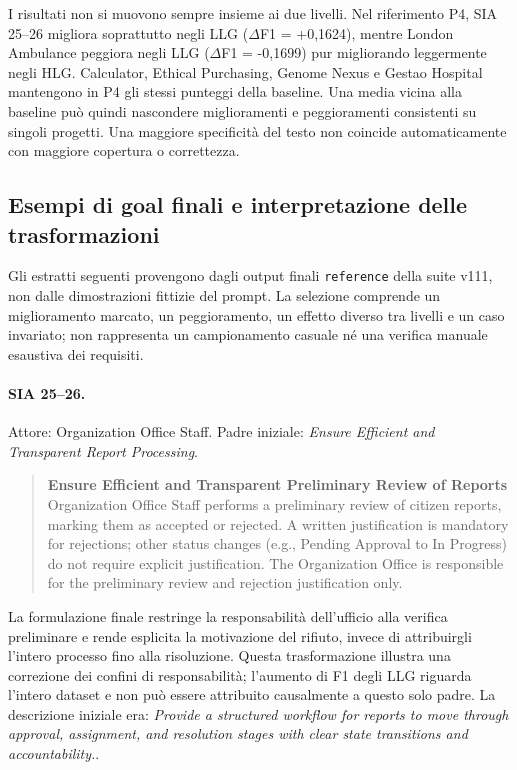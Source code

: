 I risultati non si muovono sempre insieme ai due livelli.
Nel riferimento P4, SIA 25--26 migliora soprattutto negli LLG
($\Delta$F1 = +0,1624), mentre London Ambulance peggiora negli LLG
($\Delta$F1 = -0,1699) pur migliorando leggermente negli HLG.
Calculator, Ethical Purchasing, Genome Nexus e Gestao Hospital
mantengono in P4 gli stessi punteggi della baseline. Una media vicina
alla baseline pu\`o quindi nascondere miglioramenti e peggioramenti
consistenti su singoli progetti. Una maggiore specificit\`a del testo
non coincide automaticamente con maggiore copertura o correttezza.

\subsection{Esempi di goal finali e interpretazione delle trasformazioni}
Gli estratti seguenti provengono dagli output finali \texttt{reference}
della suite v111, non dalle dimostrazioni fittizie del prompt.
La selezione comprende un miglioramento marcato, un peggioramento,
un effetto diverso tra livelli e un caso invariato; non rappresenta
un campionamento casuale n\'e una verifica manuale esaustiva dei requisiti.
\paragraph{SIA 25--26.}
Attore: Organization Office Staff. Padre iniziale: \emph{Ensure Efficient and Transparent Report Processing}.
\begin{quote}\small
\textbf{Ensure Efficient and Transparent Preliminary Review of Reports}\\
Organization Office Staff performs a preliminary review of citizen reports, marking them as accepted or rejected. A written justification is mandatory for rejections; other status changes (e.g., Pending Approval to In Progress) do not require explicit justification. The Organization Office is responsible for the preliminary review and rejection justification only.
\end{quote}
La formulazione finale restringe la responsabilit\`a dell'ufficio alla verifica preliminare e rende esplicita la motivazione del rifiuto, invece di attribuirgli l'intero processo fino alla risoluzione. Questa trasformazione illustra una correzione dei confini di responsabilit\`a; l'aumento di F1 degli LLG riguarda l'intero dataset e non pu\`o essere attribuito causalmente a questo solo padre.
La descrizione iniziale era: \emph{Provide a structured workflow for reports to move through approval, assignment, and resolution stages with clear state transitions and accountability.}.
